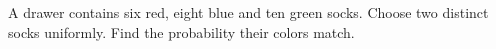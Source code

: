 A drawer contains six red, eight blue and ten green socks. Choose two distinct socks uniformly. Find the probability their colors match.
